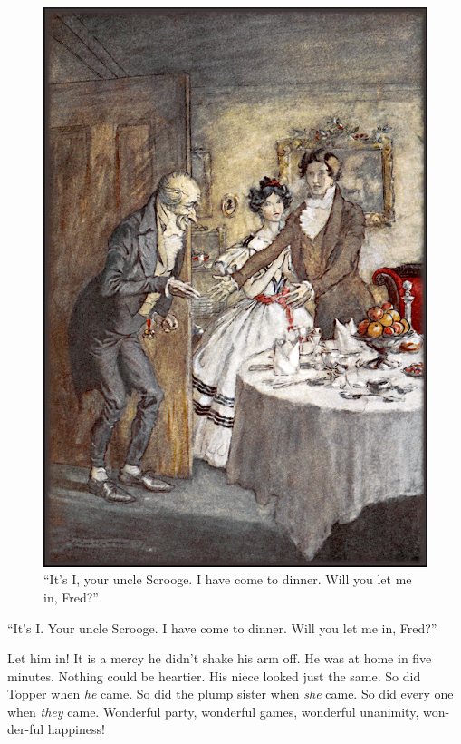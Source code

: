 \documentclass[paper=5.5in:8.5in,BCOR=15mm,twoside,DIV=15,headinclude=off,12pt,chapterprefix=off,openany,headings=huge]{scrbook} %
\begin{document}
\begin{figure}[p]
\begin{minipage}[c]{\linewidth}
\includegraphics[width=\linewidth]{freddinner}
\caption*{\enquote{It's I, your uncle Scrooge. I have come to dinner. Will you let me in, Fred?}}
\end{minipage}
\end{figure}

\enquote{It's I. Your uncle Scrooge. I have come to dinner. Will you let me in, Fred?}

Let him in! It is a mercy he didn't shake his arm off. He was at home in five minutes. Nothing could be heartier. His niece looked just the same. So did Topper when \textit{he} came. So did the plump sister when \textit{she} came. So did every one when \textit{they} came. Wonderful party, wonderful games, wonderful unanimity, won-der-ful happiness!
\end{document}
